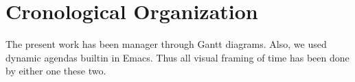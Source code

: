 \documentclass[
12pt,				%
openright,			%
oneside,			%
a4paper,			%
brazil,				%
english,			%
]{abntex2}
\begin{document}




\section{Cronological Organization}

The present work has been manager through Gantt diagrams. Also, we
used dynamic agendas builtin in Emacs. Thus all visual framing of time
has been done by either one these two.




\end{document}
